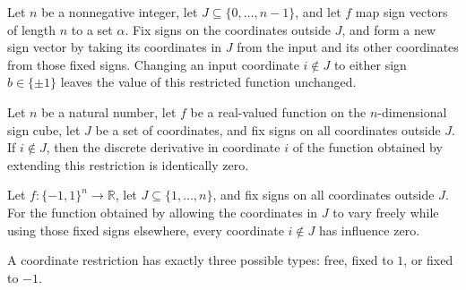 \begin{theorem}
\label{FABL.extendedSignRestriction_setCoordinate_of_not_mem}
\leanok
{}
Let $n$ be a nonnegative integer, let $J\subseteq\{0,\ldots,n-1\}$, and let $f$ map sign
vectors of length $n$ to a set $\alpha$. Fix signs on the coordinates outside $J$, and
form a new sign vector by taking its coordinates in $J$ from the input and its other
coordinates from those fixed signs. Changing an input coordinate $i\notin J$ to either
sign $b\in\{\pm1\}$ leaves the value of this restricted function unchanged.
\end{theorem}

\begin{theorem}
\label{FABL.discreteDerivative_extendedSignRestriction_of_not_mem}
\leanok
{}
Let $n$ be a natural number, let $f$ be a real-valued function on the $n$-dimensional
sign cube, let $J$ be a set of coordinates, and fix signs on all coordinates outside
$J$. If $i\notin J$, then the discrete derivative in coordinate $i$ of the function
obtained by extending this restriction is identically zero.
\end{theorem}

\begin{theorem}
\label{FABL.influence_extendedSignRestriction_of_not_mem}
\leanok
{}
Let $f:\{-1,1\}^n\to\mathbb{R}$, let $J\subseteq\{1,\ldots,n\}$, and fix signs on all
coordinates outside $J$. For the function obtained by allowing the coordinates in $J$ to
vary freely while using those fixed signs elsewhere, every coordinate $i\notin J$ has
influence zero.
\end{theorem}

\begin{definition}
\label{FABL.CoordRestriction}
\leanok
A coordinate restriction has exactly three possible types: free, fixed to $1$, or fixed
to $-1$.
\end{definition}

